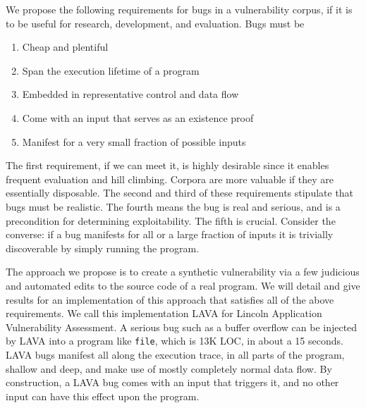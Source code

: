 We propose the following requirements for bugs in a vulnerability corpus, if it is to be useful for research, development, and evaluation.
Bugs must be
\begin{enumerate}
\item Cheap and plentiful
\item Span the execution lifetime of a program
\item Embedded in representative control and data flow
\item Come with an input that serves as an existence proof 
\item Manifest for a very small fraction of possible inputs
\end {enumerate}
The first requirement, if we can meet it, is highly desirable since it enables frequent evaluation and hill climbing. 
Corpora are more valuable if they are essentially disposable. 
The second and third of these requirements stipulate that bugs must be realistic.
The fourth means the bug is real and serious, and is a precondition for determining exploitability. 
The fifth is crucial.
Consider the converse: if a bug manifests for all or a large fraction of inputs it is trivially discoverable by simply running the program.

The approach we propose is to create a synthetic vulnerability via a few judicious and automated edits to the source code of a real program.
We will detail and give results for an implementation of this approach that satisfies all of the above requirements.
We call this implementation LAVA for Lincoln Application Vulnerability Assessment.    
A serious bug such as a buffer overflow can be injected by LAVA into a program like \verb+file+, which is 13K LOC, in about a 15 seconds.
LAVA bugs manifest all along the execution trace, in all parts of the program, shallow and deep, and make use of mostly completely normal data flow.
By construction, a LAVA bug comes with an input that triggers it, and no other input can have this effect upon the program.
